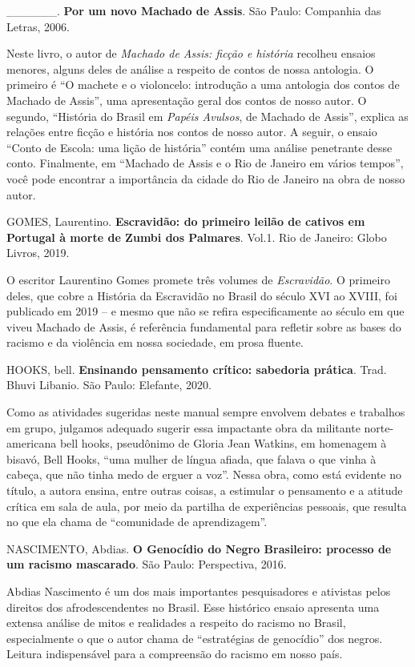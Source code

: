 \documentclass[12pt]{extarticle}
\begin{document}
\_\_\_\_\_\_. \textbf{Por um novo Machado de Assis}. São Paulo:
Companhia das Letras, 2006.

Neste livro, o autor de \emph{Machado de Assis: ficção e história}
recolheu ensaios menores, alguns deles de análise a respeito de contos
de nossa antologia. O primeiro é ``O machete e o violoncelo: introdução
a uma antologia dos contos de Machado de Assis'', uma apresentação geral
dos contos de nosso autor. O segundo, ``História do Brasil em
\emph{Papéis Avulsos}, de Machado de Assis'', explica as relações entre
ficção e história nos contos de nosso autor. A seguir, o ensaio ``Conto
de Escola: uma lição de história'' contém uma análise penetrante desse
conto. Finalmente, em ``Machado de Assis e o Rio de Janeiro em vários
tempos'', você pode encontrar a importância da cidade do Rio de Janeiro
na obra de nosso autor.

GOMES, Laurentino. \textbf{Escravidão: do primeiro leilão de cativos em
Portugal à morte de Zumbi dos Palmares}. Vol.1. Rio de Janeiro: Globo
Livros, 2019.

O escritor Laurentino Gomes promete três volumes de \emph{Escravidão}. O
primeiro deles, que cobre a História da Escravidão no Brasil do século
XVI ao XVIII, foi publicado em 2019 -- e mesmo que não se refira
especificamente ao século em que viveu Machado de Assis, é referência
fundamental para refletir sobre as bases do racismo e da violência em
nossa sociedade, em prosa fluente.

HOOKS, bell. \textbf{Ensinando pensamento crítico: sabedoria prática}.
Trad. Bhuvi Libanio. São Paulo: Elefante, 2020.

Como as atividades sugeridas neste manual sempre envolvem debates e
trabalhos em grupo, julgamos adequado sugerir essa impactante obra da
militante norte-americana bell hooks, pseudônimo de Gloria Jean Watkins,
em homenagem à bisavó, Bell Hooks, ``uma mulher de língua afiada, que
falava o que vinha à cabeça, que não tinha medo de erguer a voz''. Nessa
obra, como está evidente no título, a autora ensina, entre outras
coisas, a estimular o pensamento e a atitude crítica em sala de aula,
por meio da partilha de experiências pessoais, que resulta no que ela
chama de ``comunidade de aprendizagem''.

NASCIMENTO, Abdias. \textbf{O Genocídio do Negro Brasileiro: processo de
um racismo mascarado}. São Paulo: Perspectiva, 2016.

Abdias Nascimento é um dos mais importantes pesquisadores e ativistas
pelos direitos dos afrodescendentes no Brasil. Esse histórico ensaio
apresenta uma extensa análise de mitos e realidades a respeito do
racismo no Brasil, especialmente o que o autor chama de ``estratégias de
genocídio'' dos negros. Leitura indispensável para a compreensão do
racismo em nosso país.
\end{document}
